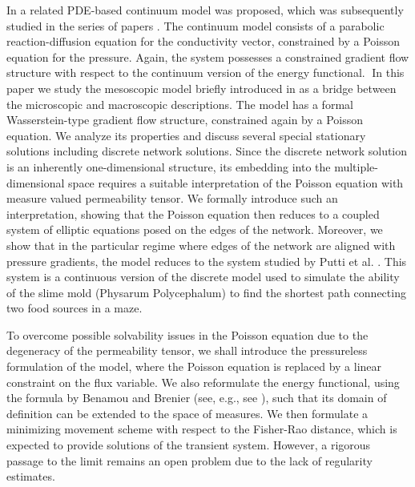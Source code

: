 \documentclass{article}
\numberwithin{equation}{section}
\begin{document}
In \cite{hu2013optimization} a related PDE-based continuum model was proposed,
which was subsequently studied in the series of papers \cite{haskovec2015mathematical, haskovec2016notes, albi2016biological, albi2017continuum}.
The continuum model consists of a parabolic reaction-diffusion equation for the conductivity vector, constrained by a Poisson equation for the pressure.
Again, the system possesses a constrained gradient flow structure with respect to the continuum version of the energy functional.
In this paper we study the mesoscopic model briefly introduced in \cite{albi2017continuum} as a bridge between the microscopic and macroscopic descriptions.
The model has a formal Wasserstein-type gradient flow structure, constrained again by a Poisson equation.
We analyze its properties and discuss several special stationary solutions including discrete network solutions.
Since the discrete network solution is an inherently one-dimensional structure, its embedding into the multiple-dimensional space
requires a suitable interpretation of the Poisson equation with measure valued permeability tensor.
We formally introduce such an interpretation, showing that the Poisson equation then reduces to a coupled system
of elliptic equations posed on the edges of the network.
Moreover, we show that in the particular regime where edges of the network are aligned with pressure gradients,
the model reduces to the system studied by Putti et al. \cite{facca2018towards}.
This system is a continuous version of the discrete model \cite{Tero} used to simulate the
ability of the slime mold (Physarum Polycephalum) to find the shortest path connecting two food sources in a maze.

To overcome possible solvability issues in the Poisson equation due to the degeneracy of the permeability tensor,
we shall introduce the pressureless formulation of the model, where the Poisson equation is replaced by a linear constraint on the flux variable.
We also reformulate the energy functional, using the formula by Benamou and Brenier (see, e.g., see \cite{santambrogio2015optimal}),
such that its domain of definition can be extended to the space of measures.
We then formulate a minimizing movement scheme with respect to the Fisher-Rao distance, which is expected to provide
solutions of the transient system. However, a rigorous passage to the limit remains an open problem
due to the lack of regularity estimates.
\end{document}
